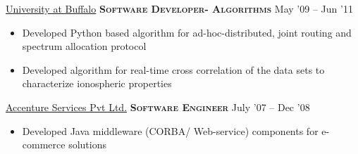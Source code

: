 \documentclass[10pt,a4paper]{article} %
\begin{document}

\headedsection %
{\href{http://www.ece.neu.edu/wineslab/}{University at Buffalo}}
{\textsc{\textbf{Software Developer- Algorithms}}} {May '09 -- Jun '11}
	\bodytext
	{
	  \begin{itemize}
		\item Developed Python based algorithm for ad-hoc-distributed, joint routing and spectrum allocation protocol
		\item Developed algorithm for real-time cross correlation of the data sets to characterize ionospheric properties
	  \end{itemize}
	}


\headedsection %
{\href{http://www.accenture.com/}{Accenture Services Pvt Ltd.}}
{\textsc{\textbf{Software Engineer}}} {July '07 -- Dec '08}
	\bodytext
	{
	  \begin{itemize}
		\item Developed Java middleware (CORBA/ Web-service) components for e-commerce solutions
	  \end{itemize}
	}

\spacedhrule{0.5em}{-0.4em} %

\end{document}

